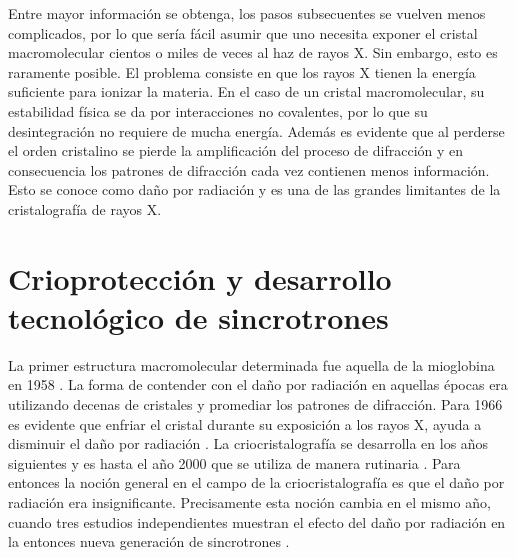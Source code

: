 Entre mayor información se obtenga, los pasos subsecuentes se vuelven menos complicados, por lo que sería fácil asumir que uno necesita exponer el cristal macromolecular cientos o miles de veces al haz de rayos X. Sin embargo, esto es raramente posible. El problema consiste en que los rayos X tienen la energía suficiente para ionizar la materia. En el caso de un cristal macromolecular, su estabilidad física se da por interacciones no covalentes, por lo que su desintegración no requiere de mucha energía. Además es evidente que al perderse el orden cristalino se pierde la amplificación del proceso de difracción y en consecuencia los patrones de difracción cada vez contienen menos información. Esto se conoce como daño por radiación y es una de las grandes limitantes de la cristalografía de rayos X.


\section{Crioprotección y desarrollo tecnológico de sincrotrones}

La primer estructura macromolecular determinada fue aquella de la mioglobina en 1958 \cite{Kendrew1958}. La forma de contender con el daño por radiación en aquellas épocas era utilizando decenas de cristales y promediar los patrones de difracción. Para 1966 es evidente que enfriar el cristal durante su exposición a los rayos X, ayuda a disminuir el daño por radiación \cite{Low1966}. La criocristalografía se desarrolla en los años siguientes y es hasta el año 2000 que se utiliza de manera rutinaria \cite{Garman2003}. Para entonces la noción general en el campo de la criocristalografía es que el daño por radiación era insignificante. Precisamente esta noción cambia en el mismo año, cuando tres estudios independientes muestran el efecto del daño por radiación en la entonces nueva generación de sincrotrones \cite{Teng2000, Ravelli2000, Weik2000}.

